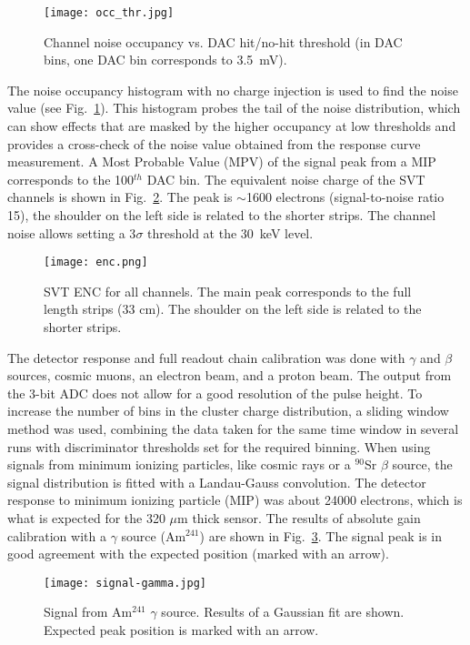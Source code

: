\begin{figure}[hbt] 
\centering 
\texttt{[image: occ\_thr.jpg]}
\caption{Channel noise occupancy vs. DAC hit/no-hit threshold (in DAC bins, one DAC bin corresponds to 3.5~mV).}
\label{fig:noiseocc}
\end{figure}

The noise occupancy histogram with no charge injection is used to find the noise value (see Fig.~\ref{fig:noiseocc}). This histogram probes the tail of the noise distribution, which can show effects that are masked by the higher occupancy at low thresholds and provides a cross-check of the noise value obtained from the response curve measurement. A Most Probable Value (MPV) of the signal peak from a MIP corresponds to the 100$^{th}$ DAC bin. The equivalent noise charge of the SVT channels is shown in  Fig.~\ref{fig:enc}. The peak is $\sim$1600 electrons (signal-to-noise ratio 15), the shoulder on the left side is related to the shorter strips. The channel noise allows setting a 3$\sigma$ threshold at the 30~keV level. 

\begin{figure}[hbt] 
	\centering 
	\texttt{[image: enc.png]}
	\caption{SVT ENC for all channels. The main peak corresponds to the full length strips (33 cm). The shoulder on the left side is related to the shorter strips.}
	\label{fig:enc}
\end{figure}

The detector response and full readout chain calibration was done with $\gamma$ and $\beta$ sources, cosmic muons, an electron beam, and a proton beam. The output from the 3-bit ADC does not allow for a good resolution of the pulse height. To increase the number of bins in the cluster charge distribution, a sliding window method was used, combining the data taken for the same time window in several runs with discriminator thresholds set for the required binning. When using signals from minimum ionizing particles, like cosmic rays or a $^{90}$Sr $\beta$ source, the signal distribution is fitted with a Landau-Gauss convolution. The detector response to minimum ionizing particle (MIP) was about 24000 electrons, which is what is expected for the 320 $\mu$m thick sensor. The results of absolute gain calibration with a $\gamma$ source (Am$^{241}$) are shown in Fig.~\ref{fig:signal-gamma}. The signal peak is in good agreement with the expected position (marked with an arrow). 

\begin{figure}[hbt] 
	\centering 
	\texttt{[image: signal-gamma.jpg]}
	\caption{Signal from Am$^{241}$ $\gamma$ source. Results of a Gaussian fit are shown. Expected peak position is marked with an arrow.}
	\label{fig:signal-gamma}
\end{figure}

